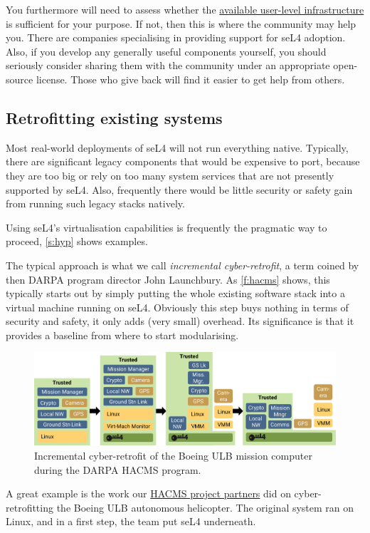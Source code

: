 \documentclass[english,a4paper,12pt\ifDraft,draft\fi]{report}
\newcommand{\SSect}[1]{\subsection{#1}}
\newcommand{\SSect}[1]{\section{#1}}
\begin{document}
  You furthermore will need to assess whether the
  \href{https://docs.sel4.systems/projects/available-user-components.html}{available
    user-level infrastructure} is sufficient for your purpose. If not,
  then this is where the community may help you. There are companies
  specialising in providing support for seL4 adoption. Also, if you
  develop any generally useful components yourself, you should
  seriously consider sharing them with the community under an
  appropriate open-source license. Those who give back will find it
  easier to get help from others.

  \SSect{Retrofitting existing systems}

  Most real-world deployments of seL4 will not run everything
  native. Typically, there are significant legacy components that would
  be expensive to port, because they are too big or rely on too many
  system services that are not presently supported by seL4. Also,
  frequently there would be little security or safety gain from
  running such legacy stacks natively.

  Using seL4's virtualisation capabilities is frequently the pragmatic
  way to proceed, \autoref{s:hyp} shows examples.

  The typical approach is what we call \emph{incremental
    cyber-retrofit}, a term coined by then DARPA program director John
  Launchbury. As \autoref{f:hacms} shows, this typically starts out by simply putting the whole existing
  software stack into a virtual machine running on seL4. Obviously
  this step buys nothing in terms of security and safety, it only adds
  (very small) overhead. Its significance is that it provides a
  baseline from where to start modularising.

  \begin{figure}[tb]
    \centering
    \includegraphics{hacms}
    \caption[Incremental cyber-retrofit on the ULB.]{Incremental
      cyber-retrofit of the Boeing ULB mission computer during the
      DARPA HACMS program.}
    \label{f:hacms}
  \end{figure}

  A great example is the work our \href{https://trustworthy.systems/projects/TS/SMACCM/}{HACMS project partners} did on cyber-retrofitting the Boeing
  ULB autonomous helicopter. The original system ran on Linux, and in
  a first step, the team put seL4 underneath.
\end{document}
